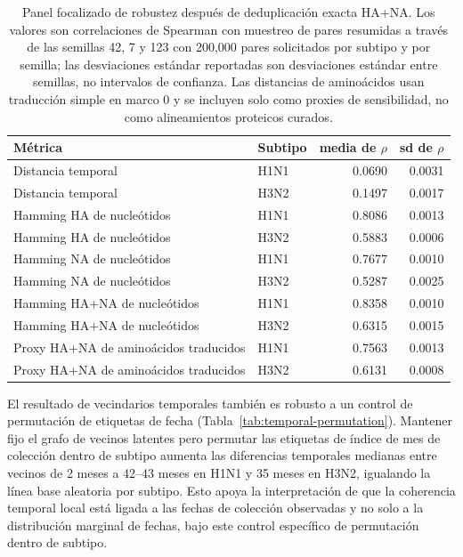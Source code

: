 \documentclass[11pt]{article}
\begin{document}
\begin{table}[H]
\centering
\caption{Panel focalizado de robustez después de deduplicación exacta HA+NA. Los valores son correlaciones de Spearman con muestreo de pares resumidas a través de las semillas 42, 7 y 123 con 200,000 pares solicitados por subtipo y por semilla; las desviaciones estándar reportadas son desviaciones estándar entre semillas, no intervalos de confianza. Las distancias de aminoácidos usan traducción simple en marco 0 y se incluyen solo como proxies de sensibilidad, no como alineamientos proteicos curados.}
\label{tab:robust-spearman}
\begin{tabular}{llrr}
\toprule
Métrica & Subtipo & media de $\rho$ & sd de $\rho$ \\
\midrule
Distancia temporal & H1N1 & 0.0690 & 0.0031 \\
Distancia temporal & H3N2 & 0.1497 & 0.0017 \\
Hamming HA de nucleótidos & H1N1 & 0.8086 & 0.0013 \\
Hamming HA de nucleótidos & H3N2 & 0.5883 & 0.0006 \\
Hamming NA de nucleótidos & H1N1 & 0.7677 & 0.0010 \\
Hamming NA de nucleótidos & H3N2 & 0.5287 & 0.0025 \\
Hamming HA+NA de nucleótidos & H1N1 & 0.8358 & 0.0010 \\
Hamming HA+NA de nucleótidos & H3N2 & 0.6315 & 0.0015 \\
Proxy HA+NA de aminoácidos traducidos & H1N1 & 0.7563 & 0.0013 \\
Proxy HA+NA de aminoácidos traducidos & H3N2 & 0.6131 & 0.0008 \\
\bottomrule
\end{tabular}
\end{table}

El resultado de vecindarios temporales también es robusto a un control de permutación de etiquetas de fecha (Tabla~\ref{tab:temporal-permutation}). Mantener fijo el grafo de vecinos latentes pero permutar las etiquetas de índice de mes de colección dentro de subtipo aumenta las diferencias temporales medianas entre vecinos de 2 meses a 42--43 meses en H1N1 y 35 meses en H3N2, igualando la línea base aleatoria por subtipo. Esto apoya la interpretación de que la coherencia temporal local está ligada a las fechas de colección observadas y no solo a la distribución marginal de fechas, bajo este control específico de permutación dentro de subtipo.
\end{document}
